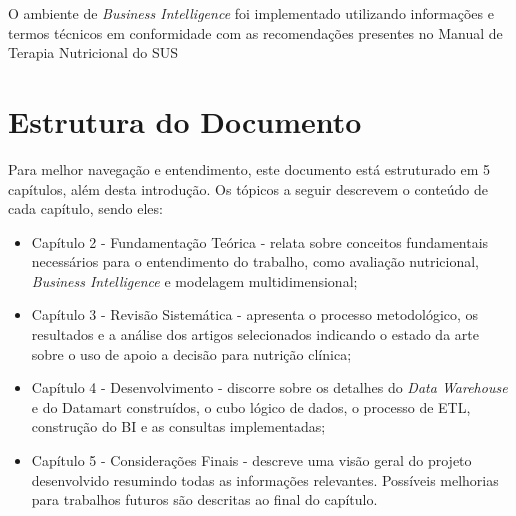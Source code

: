 O ambiente de \textit{Business Intelligence} foi implementado utilizando informações e termos técnicos em conformidade com as recomendações presentes no Manual de Terapia Nutricional do SUS \cite{manualnutricao2016}

\section{Estrutura do Documento}\label{sec-divisoes}
Para melhor navegação e entendimento, este documento está estruturado em 5 capítulos, além desta introdução. Os tópicos a seguir descrevem o conteúdo de cada capítulo, sendo eles:
\begin{itemize}
 \item Capítulo 2 - Fundamentação Teórica - relata sobre conceitos fundamentais necessários para o entendimento do trabalho, como avaliação nutricional, \textit{Business Intelligence} e modelagem multidimensional;

 \item Capítulo 3 - Revisão Sistemática - apresenta o processo metodológico, os resultados e a análise dos artigos selecionados indicando o estado da arte sobre o uso de apoio a decisão para nutrição clínica;

 \item Capítulo 4 - Desenvolvimento - discorre sobre os detalhes do \textit{Data Warehouse} e do Datamart construídos, o cubo lógico de dados, o processo de ETL, construção do BI e as consultas implementadas;
 
 \item Capítulo 5 - Considerações Finais - descreve uma visão geral do projeto desenvolvido resumindo todas as informações relevantes. Possíveis melhorias para trabalhos futuros são descritas ao final do capítulo.
\end{itemize}